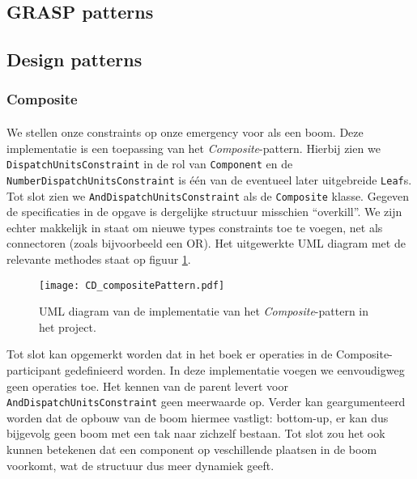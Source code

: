 \subsection{GRASP patterns}
\subsection{Design patterns}
\subsubsection{Composite}
\paragraph{}
We stellen onze constraints op onze emergency voor als een boom. Deze implementatie is een toepassing van het \textit{Composite}-pattern. Hierbij zien we \texttt{Dispatch\-Units\-Constraint} in de rol van \texttt{Component} en de \texttt{Number\-Dispatch\-Units\-Constraint} is \'e\'en van de eventueel later uitgebreide \texttt{Leaf}s. Tot slot zien we \texttt{And\-Dispatch\-Units\-Constraint} als de \texttt{Composite} klasse. Gegeven de specificaties in de opgave is dergelijke structuur misschien ``overkill''. We zijn echter makkelijk in staat om nieuwe types constraints toe te voegen, net als connectoren (zoals bijvoorbeeld een OR). Het uitgewerkte UML diagram met de relevante methodes staat op figuur \ref{fig:compositePattern}.
\begin{figure}[htb]
\texttt{[image: CD\_compositePattern.pdf]}
\caption{UML diagram van de implementatie van het \textit{Composite}-pattern in het project.}
\label{fig:compositePattern}
\end{figure}
Tot slot kan opgemerkt worden dat in het boek er operaties in de Composite-participant gedefinieerd worden. In deze implementatie voegen we eenvoudigweg geen operaties toe. Het kennen van de parent levert voor \verb+AndDispatchUnitsConstraint+ geen meerwaarde op. Verder kan geargumenteerd worden dat de opbouw van de boom hiermee vastligt: bottom-up, er kan dus bijgevolg geen boom met een tak naar zichzelf bestaan. Tot slot zou het ook kunnen betekenen dat een component op veschillende plaatsen in de boom voorkomt, wat de structuur dus meer dynamiek geeft.
